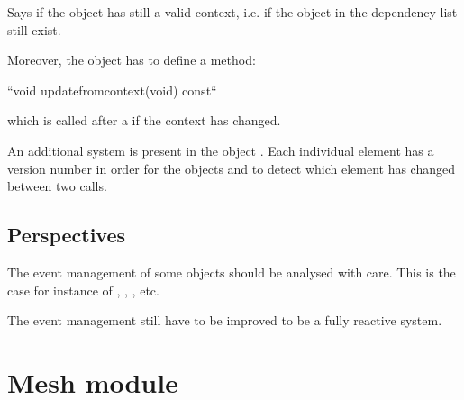 \documentclass[a4paper,11pt,english]{sphinxmanual}
\begin{document}

\begin{fulllineitems}
\label{\detokenize{project/libdesc_event:_CPPv4N6getfem20context_dependencies13context_validEv}}%
\pysigstartmultiline
{}%
\pysigstopmultiline
Says if the object has still a valid context, i.e. if the object in the
dependency list still exist.

\end{fulllineitems}


Moreover, the object has to define a method:

\begin{sphinxVerbatim}[commandchars=\\\{\}]
``void update\PYGZus{}from\PYGZus{}context(void) const``
\end{sphinxVerbatim}

which is called after a  if the context has changed.

An additional system is present in the object . Each individual element has a
version number in order for the objects  and  to detect which element
has changed between two calls.


\subsection{Perspectives}
\label{\detokenize{project/libdesc_event:perspectives}}
The event management of some objects should be analysed with care. This is the case for instance of , , , etc.

The event management still have to be improved to be a fully reactive system.


\section{Mesh module}
\label{\detokenize{project/libdesc_mesh:mesh-module}}\label{\detokenize{project/libdesc_mesh:dp-libdesc-mesh}}\label{\detokenize{project/libdesc_mesh::doc}}
\end{document}
